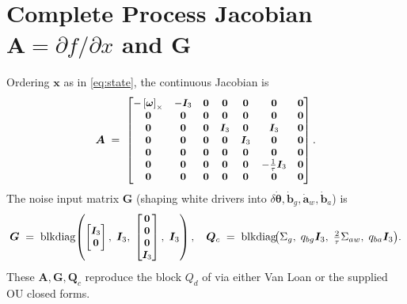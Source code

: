 \documentclass[11pt]{article}
\newcommand{\vect}[1]{\bm{#1}}
\newcommand{\mat}[1]{\bm{#1}}
\newcommand{\I}{\mat{I}}
\newcommand{\skx}[1]{\left[ #1 \right]_\times}
\begin{document}
\section{Complete Process Jacobian \texorpdfstring{$\mat{A}=\partial f/\partial x$}{A} and \texorpdfstring{$\mat{G}$}{G}}
\label{sec:AG}
Ordering \(\vect{x}\) as in \eqref{eq:state}, the continuous Jacobian is
\begin{equation}
\small
\mat{A} \;=\;
\begin{bmatrix}
 -\skx{\vect{\omega}} & -\I_3 & \mat{0} & \mat{0} & \mat{0} & \mat{0} & \mat{0} \\
 \mat{0}               & \mat{0} & \mat{0} & \mat{0} & \mat{0} & \mat{0} & \mat{0} \\
 \mat{0} & \mat{0} & \mat{0} & \I_3 & \mat{0} & \I_3 & \mat{0} \\
 \mat{0} & \mat{0} & \mat{0} & \mat{0} & \I_3 & \mat{0} & \mat{0} \\
 \mat{0} & \mat{0} & \mat{0} & \mat{0} & \mat{0} & \mat{0} & \mat{0} \\
 \mat{0} & \mat{0} & \mat{0} & \mat{0} & \mat{0} & -\tfrac{1}{\tau}\I_3 & \mat{0} \\
 \mat{0} & \mat{0} & \mat{0} & \mat{0} & \mat{0} & \mat{0} & \mat{0}
\end{bmatrix}.
\label{eq:A-ct}
\end{equation}
The noise input matrix \(\mat{G}\) (shaping white drivers into \(\delta\dot{\vect{\theta}},\dot{\vect{b}}_g,\dot{\vect{a}}_w,\dot{\vect{b}}_a\)) is
\begin{equation}
\small
\mat{G} \;=\; \mathrm{blkdiag}\!\left(
\begin{bmatrix}\I_3\\ \mat{0}\end{bmatrix},\;
\I_3,\;
\begin{bmatrix}\mat{0}\\ \mat{0}\\ \mat{0}\\ \I_3\end{bmatrix},\;
\I_3
\right),
\quad
\mat{Q}_c \;=\; \mathrm{blkdiag}\!\bigl(\Sigma_g,\; q_{bg}\I_3,\; \tfrac{2}{\tau}\Sigma_{aw},\; q_{ba}\I_3\bigr).
\label{eq:GQc}
\end{equation}
These \(\mat{A},\mat{G},\mat{Q}_c\) reproduce the block \(Q_d\) of  via
either Van Loan or the supplied OU closed forms.
\end{document}
